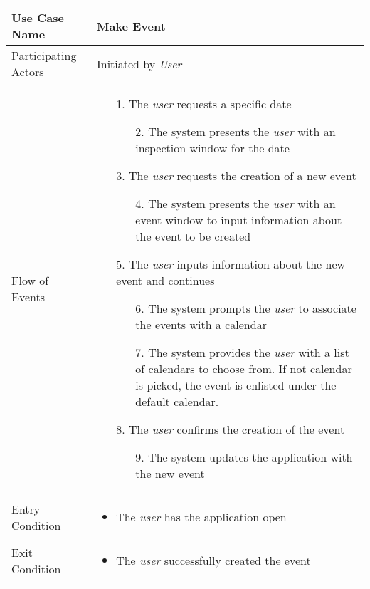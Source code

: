 \begin{center}
	\begin{tabular}{ | l | p{10cm} |  }
		 \hline
		Use Case Name & Make Event \\ \hline
		Participating Actors & Initiated by \emph{User} \\ \hline
		Flow of Events & \begin{enumerate}
						\item[1.] The \emph{user} requests a specific date
						\begin{enumerate}
							\item[2.] The system presents the \emph{user} with an inspection window for the date
						\end{enumerate}
						\item[3.] The \emph{user} requests the creation of a new event
						\begin{enumerate}
							\item[4.] The system presents the \emph{user} with an event window to input information about the event           to be created
						\end{enumerate}
						\item[5.] The \emph{user} inputs information about the new event and continues
						\begin{enumerate}
							\item[6.] The system prompts the \emph{user} to associate the events with a calendar
							\item[7.] The system provides the \emph{user} with a list of calendars to choose from. If not calendar is picked, the event is enlisted under the default calendar.
						\end{enumerate}
						\item[8.] The \emph{user} confirms the creation of the event
						\begin{enumerate}
							\item[9.] The system updates the application with the new event
						\end{enumerate}
					\end{enumerate} \\ \hline
		Entry Condition & \begin{itemize}
						\item The \emph{user} has the application open
					\end{itemize} \\ \hline
		Exit Condition & \begin{itemize}
						\item The \emph{user} successfully created the event
					\end{itemize} \\
		\hline
	\end{tabular}
\end{center}

